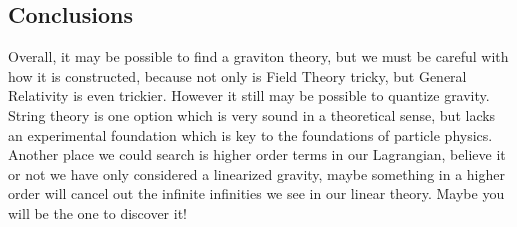 \documentclass[12pt]{article}
\begin{document}
\subsection{Conclusions}
Overall, it may be possible to find a graviton theory, but we must be careful with how it is constructed, because not only is Field Theory tricky, but General Relativity is even trickier. However it still may be possible to quantize gravity. String theory is one option which is very sound in a theoretical sense, but lacks an experimental foundation which is key to the foundations of particle physics. Another place we could search is higher order terms in our Lagrangian, believe it or not we have only considered a linearized gravity, maybe something in a higher order will cancel out the infinite infinities we see in our linear theory. Maybe you will be the one to discover it!
\nocite{*}


\end{document}

